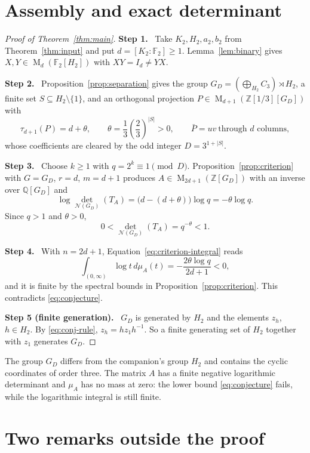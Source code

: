 \documentclass[11pt]{article}
\theoremstyle{remark}
\numberwithin{equation}{section}
\newcommand{\F}{\mathbb F}
\newcommand{\Z}{\mathbb Z}
\newcommand{\Q}{\mathbb Q}
\newcommand{\Mat}{\operatorname{M}}
\newcommand{\N}{\mathcal N}
\newcommand{\step}[1]{\par\smallskip\noindent\textbf{Step #1.}\ }
\begin{document}
\section{Assembly and exact determinant}
\label{sec:assembly}

\begin{proof}[Proof of Theorem~\ref{thm:main}]
\step{1} Take $K_2,H_2,a_2,b_2$ from Theorem~\ref{thm:input} and put $d=[K_2:\F_2]\ge1$. Lemma~\ref{lem:binary} gives $X,Y\in\Mat_d(\F_2[H_2])$ with $XY=I_d\ne YX$.

\step{2} Proposition~\ref{prop:separation} gives the group $G_D=(\bigoplus_{H_2}C_3)\rtimes H_2$, a finite set $S\subseteq H_2\setminus\{1\}$, and an orthogonal projection $P\in\Mat_{d+1}(\Z[1/3][G_D])$ with
\[
 \tau_{d+1}(P)=d+\theta,\qquad\theta=\frac13\left(\frac23\right)^{|S|}>0,\qquad \bar P=uv\ \text{through $d$ columns},
\]
whose coefficients are cleared by the odd integer $D=3^{1+|S|}$.

\step{3} Choose $k\ge1$ with $q=2^k\equiv1\pmod D$. Proposition~\ref{prop:criterion} with $G=G_D$, $r=d$, $m=d+1$ produces $A\in\Mat_{2d+1}(\Z[G_D])$ with an inverse over $\Q[G_D]$ and
\[
 \log\det_{\N(G_D)}(T_A)=\bigl(d-(d+\theta)\bigr)\log q=-\theta\log q.
\]
Since $q>1$ and $\theta>0$,
\begin{equation}\label{eq:final-det}
 0<\det_{\N(G_D)}(T_A)=q^{-\theta}<1.
\end{equation}

\step{4} With $n=2d+1$, Equation~\eqref{eq:criterion-integral} reads
\begin{equation}\label{eq:final-integral}
 \int_{(0,\infty)}\log t\,d\mu_A(t)
 =-\frac{2\theta\log q}{2d+1}<0,
\end{equation}
and it is finite by the spectral bounds in Proposition~\ref{prop:criterion}. This contradicts \eqref{eq:conjecture}.

\step{5 (finite generation)} $G_D$ is generated by $H_2$ and the elements $z_h$, $h\in H_2$. By \eqref{eq:conj-rule}, $z_h=hz_1h^{-1}$. So a finite generating set of $H_2$ together with $z_1$ generates $G_D$.
\end{proof}

The group $G_D$ differs from the companion's group $H_2$ and contains the cyclic coordinates of order three. The matrix $A$ has a finite negative logarithmic determinant and $\mu_A$ has no mass at zero: the lower bound \eqref{eq:conjecture} fails, while the logarithmic integral is still finite.

\section{Two remarks outside the proof}
\end{document}
